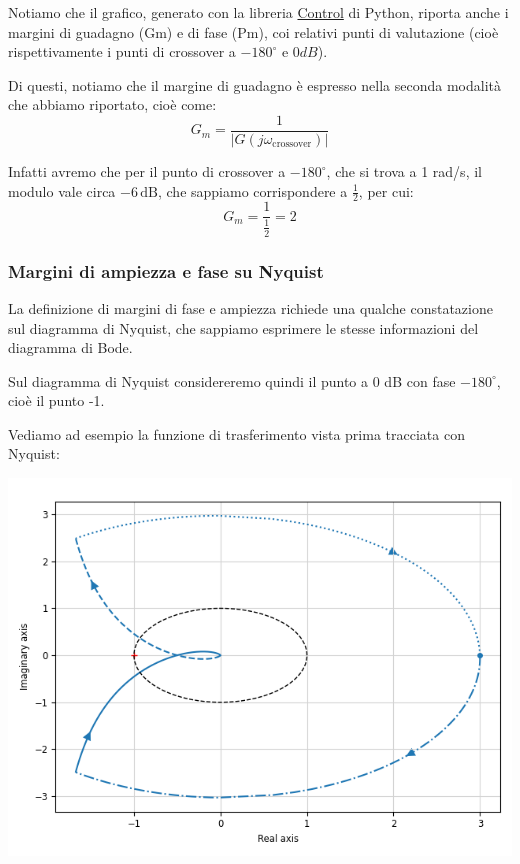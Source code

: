 \documentclass[a4paper,11pt]{article}
\begin{document}
Notiamo che il grafico, generato con la libreria \href{https://github.com/python-control/python-control}{Control} di Python, riporta anche i margini di guadagno (\textsf{Gm}) e di fase (\textsf{Pm}), coi relativi punti di valutazione (cioè rispettivamente i punti di crossover a $-180^\circ$ e $0 dB$).

Di questi, notiamo che il margine di guadagno è espresso nella seconda modalità che abbiamo riportato, cioè come:
$$
G_m = \frac{1}{|G(j \omega_\text{crossover})|}
$$

Infatti avremo che per il punto di crossover a $-180^\circ$, che si trova a 1 rad/s, il modulo vale circa $-6 \, \mathrm{dB}$, che sappiamo corrispondere a $\frac{1}{2}$, per cui:
$$
G_m = \frac{1}{\frac{1}{2}} = 2
$$

\subsubsection{Margini di ampiezza e fase su Nyquist}
La definizione di margini di fase e ampiezza richiede una qualche constatazione sul diagramma di Nyquist, che sappiamo esprimere le stesse informazioni del diagramma di Bode.

Sul diagramma di Nyquist considereremo quindi il punto a 0 dB con fase $-180^\circ$, cioè il punto -1.

Vediamo ad esempio la funzione di trasferimento vista prima tracciata con Nyquist:
\begin{center}
	\includegraphics[scale=0.8]{../figures/nyquist_margin.png}
\end{center}
\end{document}
